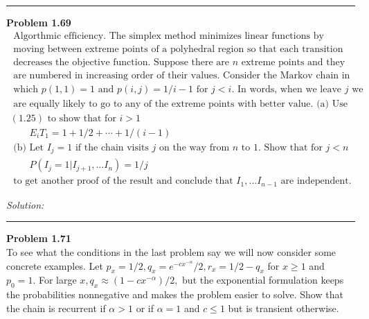 \documentclass[a4paper, 11pt]{article}
\newenvironment{problem}[2][Problem]
    { \begin{mdframed}[backgroundcolor=gray!20] \textbf{#1 #2} \\}
    {  \end{mdframed}}
\newenvironment{solution}
    {\textit{Solution:}}
    {}
\begin{document}
\noindent\rule{7in}{2.8pt}
\begin{problem}{1.69}
  \begin{equation*}
  \begin{array}{l}\text { Algorthmic efficiency. The simplex method minimizes linear functions by } \\ \text { moving between extreme points of a polyhedral region so that each transition } \\ \text { decreases the objective function. Suppose there are } n \text { extreme points and they } \\ \text { are numbered in increasing order of their values. Consider the Markov chain in } \\ \text { which } p(1,1)=1 \text { and } p(i, j)=1 / i-1 \text { for } j<i . \text { In words, when we leave } j \text { we } \\ \text { are equally likely to go to any of the extreme points with better value. (a) Use } \\ (1.25) \text { to show that for } i>1 \end{array}
  \end{equation*}
  \begin{equation*}
  \begin{array}{l}\qquad E_{i} T_{1}=1+1 / 2+\cdots+1 /(i-1) \\ \text { (b) Let } I_{j}=1 \text { if the chain visits } j \text { on the way from } n \text { to } 1 . \text { Show that for } j<n \\ \qquad P\left(I_{j}=1 | I_{j+1}, \ldots I_{n}\right)=1 / j \\ \text { to get another proof of the result and conclude that } I_{1}, \ldots I_{n-1} \text { are independent. }\end{array}
  \end{equation*}
\end{problem}

\begin{solution}

\end{solution}
\noindent\rule{7in}{2.8pt}
\begin{problem}{1.71}
  To see what the conditions in the last problem say we will now consider
  some concrete examples. Let \(p_{x}=1 / 2, q_{x}=e^{-c x^{-\alpha}} / 2, r_{x}=1 / 2-q_{x}\) for
  \(x \geq 1\) and \(p_{0}=1 .\) For large \(x, q_{x} \approx\left(1-c x^{-\alpha}\right) / 2,\) but the exponential
  formulation keeps the probabilities nonnegative and makes the problem easier
  to solve. Show that the chain is recurrent if \(\alpha>1\) or if \(\alpha=1\) and \(c \leq 1\) but is
  transient otherwise.
\end{problem}
\end{document}
